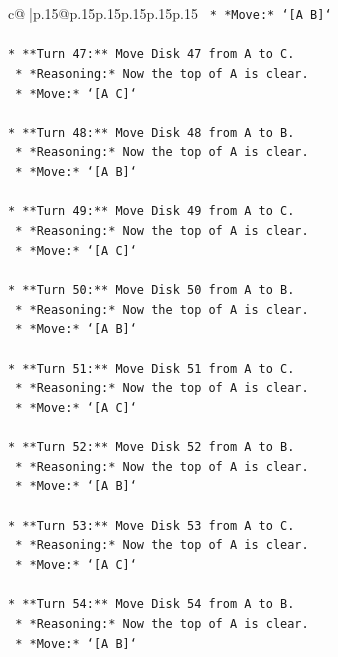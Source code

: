 \documentclass{article}
\begin{document}
{\begin{supertabular}{c@{$\;$}|p{.15\linewidth}@{}p{.15\linewidth}p{.15\linewidth}p{.15\linewidth}p{.15\linewidth}p{.15\linewidth}}
{{{\texttt{    *   *Move:* `{[}A B{]}`} \\
\\ 
\texttt{*   **Turn 47:** Move Disk 47 from A to C.} \\
\texttt{    *   *Reasoning:* Now the top of A is clear.} \\
\texttt{    *   *Move:* `{[}A C{]}`} \\
\\ 
\texttt{*   **Turn 48:** Move Disk 48 from A to B.} \\
\texttt{    *   *Reasoning:* Now the top of A is clear.} \\
\texttt{    *   *Move:* `{[}A B{]}`} \\
\\ 
\texttt{*   **Turn 49:** Move Disk 49 from A to C.} \\
\texttt{    *   *Reasoning:* Now the top of A is clear.} \\
\texttt{    *   *Move:* `{[}A C{]}`} \\
\\ 
\texttt{*   **Turn 50:** Move Disk 50 from A to B.} \\
\texttt{    *   *Reasoning:* Now the top of A is clear.} \\
\texttt{    *   *Move:* `{[}A B{]}`} \\
\\ 
\texttt{*   **Turn 51:** Move Disk 51 from A to C.} \\
\texttt{    *   *Reasoning:* Now the top of A is clear.} \\
\texttt{    *   *Move:* `{[}A C{]}`} \\
\\ 
\texttt{*   **Turn 52:** Move Disk 52 from A to B.} \\
\texttt{    *   *Reasoning:* Now the top of A is clear.} \\
\texttt{    *   *Move:* `{[}A B{]}`} \\
\\ 
\texttt{*   **Turn 53:** Move Disk 53 from A to C.} \\
\texttt{    *   *Reasoning:* Now the top of A is clear.} \\
\texttt{    *   *Move:* `{[}A C{]}`} \\
\\ 
\texttt{*   **Turn 54:** Move Disk 54 from A to B.} \\
\texttt{    *   *Reasoning:* Now the top of A is clear.} \\
\texttt{    *   *Move:* `{[}A B{]}`} \\
}}}
\end{supertabular}}
\end{document}
